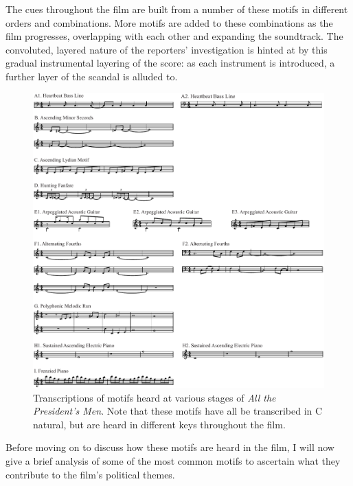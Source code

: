 The cues throughout the film are built from a number of these motifs in different orders and combinations. 
More motifs are added to these combinations as the film progresses, overlapping with each other and expanding the soundtrack.
The convoluted, layered nature of the reporters' investigation is hinted at by this gradual instrumental layering of the score: as each instrument is introduced, a further layer of the scandal is alluded to.
\begin{figure}
    \centering
    \includegraphics[width=1\linewidth]{img/president-all-motifs.pdf}
    \caption{Transcriptions of motifs heard at various stages of \textit{All the President's Men}. Note that these motifs have all be transcribed in C natural, but are heard in different keys throughout the film.}
    \label{fig:president-all-motifs}
\end{figure}



Before moving on to discuss how these motifs are heard in the film, I will now give a brief analysis of some of the most common motifs to ascertain what they contribute to the film’s political themes.



